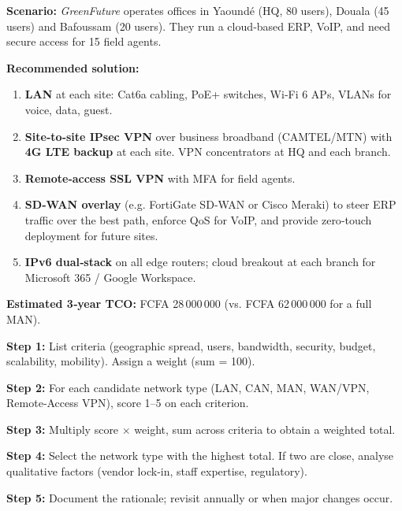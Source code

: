 \documentclass[11pt]{article}
\begin{document}
\begin{exemplebox}
\textbf{Scenario:} \emph{GreenFuture} operates offices in Yaoundé (HQ, 80 users), Douala (45 users) and Bafoussam (20 users). They run a cloud‑based ERP, VoIP, and need secure access for 15 field agents.

\textbf{Recommended solution:}
\begin{enumerate}
\item \textbf{LAN} at each site: Cat6a cabling, PoE+ switches, Wi‑Fi 6 APs, VLANs for voice, data, guest.
\item \textbf{Site‑to‑site IPsec VPN} over business broadband (CAMTEL/MTN) with \textbf{4G LTE backup} at each site. VPN concentrators at HQ and each branch.
\item \textbf{Remote‑access SSL VPN} with MFA for field agents.
\item \textbf{SD‑WAN overlay} (e.g. FortiGate SD‑WAN or Cisco Meraki) to steer ERP traffic over the best path, enforce QoS for VoIP, and provide zero‑touch deployment for future sites.
\item \textbf{IPv6 dual‑stack} on all edge routers; cloud breakout at each branch for Microsoft 365 / Google Workspace.
\end{enumerate}
\textbf{Estimated 3‑year TCO:} FCFA 28\,000\,000 (vs. FCFA 62\,000\,000 for a full MAN).
\end{exemplebox}

\begin{methode}
\textbf{Step 1:} List criteria (geographic spread, users, bandwidth, security, budget, scalability, mobility). Assign a weight (sum = 100).\par
\textbf{Step 2:} For each candidate network type (LAN, CAN, MAN, WAN/VPN, Remote‑Access VPN), score 1–5 on each criterion.\par
\textbf{Step 3:} Multiply score $\times$ weight, sum across criteria to obtain a weighted total.\par
\textbf{Step 4:} Select the network type with the highest total. If two are close, analyse qualitative factors (vendor lock‑in, staff expertise, regulatory).\par
\textbf{Step 5:} Document the rationale; revisit annually or when major changes occur.
\end{methode}
\end{document}
